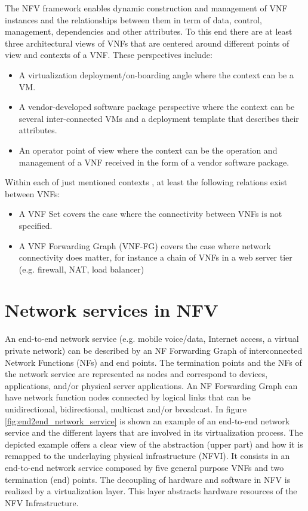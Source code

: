 The NFV framework enables dynamic construction and management of VNF instances and the relationships between them in term of data, control, management, dependencies and other attributes. To this end there are at least three architectural views of VNFs that are centered around different points of view and contexts of a VNF. These perspectives include:
\begin{itemize}
	\item A virtualization deployment/on-boarding angle where the context can be a VM.
	\item A vendor-developed software package perspective where the context can be several inter-connected VMs and a deployment template that describes their attributes.
	\item An operator point of view where the context can be the operation and management of a VNF received in the form of a vendor software package.
\end{itemize}


Within each of just mentioned contexts , at least the following relations exist between VNFs:
\begin{itemize}
	\item A VNF Set covers the case where the connectivity between VNFs is not specified.
	\item A VNF Forwarding Graph (VNF-FG) covers the case where network connectivity does matter, for instance a chain of VNFs in a web server tier (e.g. firewall, NAT, load balancer)	
\end{itemize}

\section{Network services in NFV}
An end-to-end network service (e.g. mobile voice/data, Internet access, a virtual private network) can be described by an NF Forwarding Graph of interconnected Network Functions (NFs) and end points. The termination points and the NFs of the network service are represented as nodes and correspond to devices, applications, and/or physical server applications. An NF Forwarding Graph can have network function nodes connected by logical links that can be unidirectional, bidirectional, multicast and/or broadcast.
In figure \ref{fig:end2end_network_service} is shown an example of an end-to-end network service and the different layers that are involved in its virtualization process. The depicted example offers a clear view of the abstraction (upper part) and how it is remapped to the underlaying physical infrastructure (NFVI). It consists in an end-to-end network service composed by five general purpose VNFs and two termination (end) points. The decoupling of hardware and software in NFV is realized by a virtualization layer. This layer abstracts hardware resources of the NFV Infrastructure.

